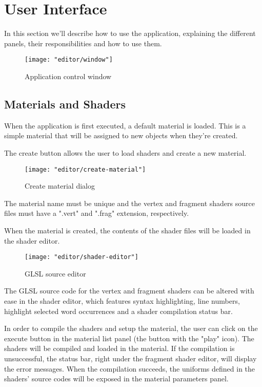 \section{User Interface}
In this section we'll describe how to use the application, explaining the different panels, their responsibilities and how to use them.

\begin{figure}
    \centering
    \texttt{[image: "editor/window"]}
    \caption{Application control window}
    \label{fig:window}
\end{figure}

\subsection{Materials and Shaders}
When the application is first executed, a default material is loaded. This is a simple material that will be assigned to new objects when they're created.

The create button allows the user to load shaders and create a new material.

\begin{figure}[h]
    \centering
    \texttt{[image: "editor/create-material"]}
    \caption{Create material dialog}
    \label{fig:create_material}
\end{figure}

The material name must be unique and the vertex and fragment shaders source files must have a ".vert" and ".frag" extension, respectively.

When the material is created, the contents of the shader files will be loaded in the shader editor.

\begin{figure}
    \centering
    \texttt{[image: "editor/shader-editor"]}
    \caption{GLSL source editor}
    \label{fig:shader_editor}
\end{figure}

The GLSL source code for the vertex and fragment shaders can be altered with ease in the shader editor, which features syntax highlighting, line numbers, highlight selected word occurrences and a shader compilation status bar.

In order to compile the shaders and setup the material, the user can click on the execute button in the material list panel (the button with the "play" icon). The shaders will be compiled and loaded in the material. If the compilation is unsuccessful, the status bar, right under the fragment shader editor, will display the error messages. When the compilation succeeds, the uniforms defined in the shaders' source codes will be exposed in the material parameters panel.

